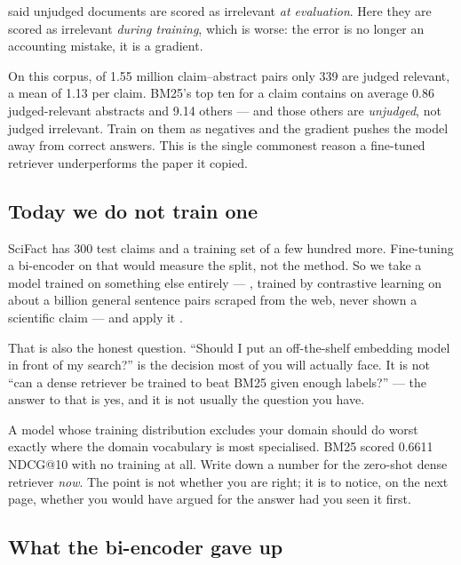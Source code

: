 \documentclass[11pt,a4paper]{article}
\begin{document}
\begin{failbox}[title={Failure condition --- the pooling problem, now inside training}]
 said unjudged documents are scored as irrelevant \emph{at
evaluation}. Here they are scored as irrelevant \emph{during training}, which
is worse: the error is no longer an accounting mistake, it is a gradient.

On this corpus, of 1.55 million claim--abstract pairs only 339 are judged
relevant, a mean of 1.13 per claim. BM25's top ten for a claim contains on
average 0.86 judged-relevant abstracts and 9.14 others --- and those others are
\emph{unjudged}, not judged irrelevant. Train on them as negatives and the
gradient pushes the model away from correct answers. This is the single
commonest reason a fine-tuned retriever underperforms the paper it copied.
\end{failbox}

\subsection{Today we do not train one}

SciFact has 300 test claims and a training set of a few hundred more.
Fine-tuning a bi-encoder on that would measure the split, not the method. So we
take a model trained on something else entirely --- ,
trained by contrastive learning on about a billion general sentence pairs
scraped from the web, never shown a scientific claim --- and apply it
.

That is also the honest question. ``Should I put an off-the-shelf embedding
model in front of my search?'' is the decision most of you will actually face.
It is not ``can a dense retriever be trained to beat BM25 given enough
labels?'' --- the answer to that is yes, and it is not usually the question you
have.

\begin{trybox}[title={Predict before you read on}]
A model whose training distribution excludes your domain should do worst
exactly where the domain vocabulary is most specialised. BM25 scored 0.6611
NDCG@10 with no training at all. Write down a number for the zero-shot dense
retriever \emph{now}. The point is not whether you are right; it is to notice,
on the next page, whether you would have argued for the answer had you seen it
first.
\end{trybox}

\subsection{What the bi-encoder gave up}
\end{document}

